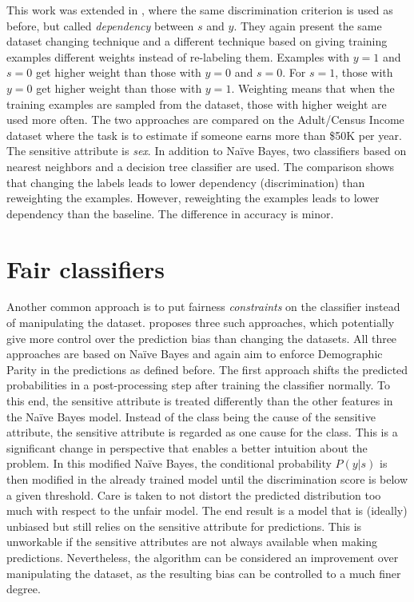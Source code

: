 This work was extended in \citet{calders2009building},
where the same discrimination criterion is used as before,
but called \emph{dependency} between \(s\) and \(y\).
They again present the same dataset changing technique
and a different technique based on giving training examples different weights
instead of re-labeling them.
Examples with \(y=1\) and \(s=0\) get higher weight than those with \(y=0\) and \(s=0\).
For \(s=1\), those with \(y=0\) get higher weight than those with \(y=1\).
Weighting means that when the training examples are sampled from the dataset,
those with higher weight are used more often.
The two approaches are compared on the Adult/Census Income dataset \citep{kohavi1996scaling}
where the task is to estimate if someone earns more than \$50K per year.
The sensitive attribute is \emph{sex}.
In addition to Na\"ive Bayes,
two classifiers based on nearest neighbors and a decision tree classifier are used.
The comparison shows that changing the labels leads to lower dependency (discrimination)
than reweighting the examples.
However, reweighting the examples leads to lower dependency than the baseline.
The difference in accuracy is minor.

\section{Fair classifiers}\label{fair-classifiers}
Another common approach is to put fairness \emph{constraints} on the classifier
instead of manipulating the dataset.
\citet{calders2010three} proposes three such approaches,
which potentially give more control over the prediction bias than changing the datasets.
All three approaches are based on Na\"ive Bayes
and again aim to enforce Demographic Parity in the predictions as defined before.
The first approach shifts the predicted probabilities in a post-processing step
after training the classifier normally.
To this end, the sensitive attribute is treated differently
than the other features in the Na\"ive Bayes model.
Instead of the class being the cause of the sensitive attribute,
the sensitive attribute is regarded as one cause for the class.
This is a significant change in perspective that enables a better intuition about the problem.
In this modified Na\"ive Bayes,
the conditional probability \(P(y|s)\) is then modified in the already trained model
until the discrimination score is below a given threshold.
Care is taken to not distort the predicted distribution too much with respect to the unfair model.
The end result is a model that is (ideally) unbiased
but still relies on the sensitive attribute for predictions.
This is unworkable if the sensitive attributes are not always available when making predictions.
Nevertheless, the algorithm can be considered an improvement over manipulating the dataset,
as the resulting bias can be controlled to a much finer degree.

